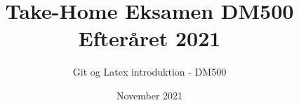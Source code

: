 \documentclass[20pt]{article}
\title{Take-Home Eksamen DM500 Efteråret 2021}
\author{Git og Latex introduktion - DM500}
\date{November 2021}
\begin{document}
	\maketitle
	
	\section*{}
	
	
	
	
	\newpage
	
	\section*{}
	
	
	
	
\end{document}
